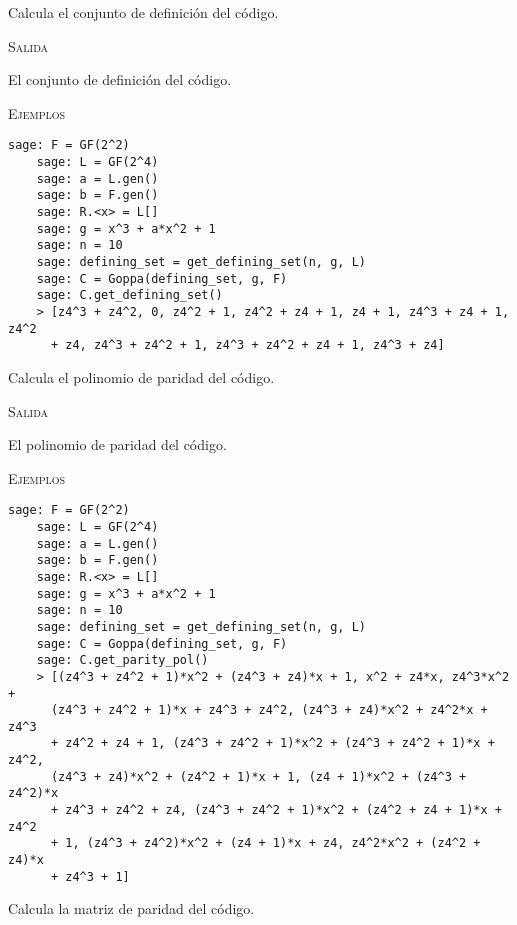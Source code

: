 \begin{description}[leftmargin=1em, font=\normalfont\ttfamily, style=nextline]
\begin{description}[font=\ttfamily, style=nextline]
  \item[get\_defining\_set(self)] Calcula el conjunto de definición del código.
  
  \textsc{Salida}
  \begin{description}[font=\normalfont\ttfamily]
    \item[] El conjunto de definición del código.
  \end{description}

  \textsc{Ejemplos}
  \begin{lstlisting}[gobble=4]
    sage: F = GF(2^2)
    sage: L = GF(2^4)
    sage: a = L.gen()
    sage: b = F.gen()
    sage: R.<x> = L[]
    sage: g = x^3 + a*x^2 + 1
    sage: n = 10
    sage: defining_set = get_defining_set(n, g, L)
    sage: C = Goppa(defining_set, g, F)
    sage: C.get_defining_set()
    > [z4^3 + z4^2, 0, z4^2 + 1, z4^2 + z4 + 1, z4 + 1, z4^3 + z4 + 1, z4^2 
      + z4, z4^3 + z4^2 + 1, z4^3 + z4^2 + z4 + 1, z4^3 + z4]
  \end{lstlisting}

  \item[get\_parity\_pol(self)] Calcula el polinomio de paridad del código.
  
  \textsc{Salida}
  \begin{description}[font=\normalfont\ttfamily]
    \item[] El polinomio de paridad del código.
  \end{description}

  \textsc{Ejemplos}
  \begin{lstlisting}[gobble=4]
    sage: F = GF(2^2)
    sage: L = GF(2^4)
    sage: a = L.gen()
    sage: b = F.gen()
    sage: R.<x> = L[]
    sage: g = x^3 + a*x^2 + 1
    sage: n = 10
    sage: defining_set = get_defining_set(n, g, L)
    sage: C = Goppa(defining_set, g, F)
    sage: C.get_parity_pol()
    > [(z4^3 + z4^2 + 1)*x^2 + (z4^3 + z4)*x + 1, x^2 + z4*x, z4^3*x^2 + 
      (z4^3 + z4^2 + 1)*x + z4^3 + z4^2, (z4^3 + z4)*x^2 + z4^2*x + z4^3 
      + z4^2 + z4 + 1, (z4^3 + z4^2 + 1)*x^2 + (z4^3 + z4^2 + 1)*x + z4^2, 
      (z4^3 + z4)*x^2 + (z4^2 + 1)*x + 1, (z4 + 1)*x^2 + (z4^3 + z4^2)*x
      + z4^3 + z4^2 + z4, (z4^3 + z4^2 + 1)*x^2 + (z4^2 + z4 + 1)*x + z4^2
      + 1, (z4^3 + z4^2)*x^2 + (z4 + 1)*x + z4, z4^2*x^2 + (z4^2 + z4)*x
      + z4^3 + 1]
  \end{lstlisting}

  \item[get\_parity\_check\_matrix(self)] Calcula la matriz de paridad del código.
  

\end{description}
\end{description}
